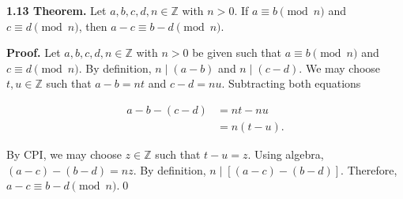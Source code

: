 \documentclass[12pt]{article}
\begin{document}
\noindent\textbf{1.13 Theorem.} Let $a,b,c,d,n\in\mathbb{Z}$ with $n>0$. If $a\equiv b\pmod{n}$ and $c\equiv d\pmod{n}$, then $a-c\equiv b-d\pmod{n}$.

\bigskip

\noindent\textbf{Proof.} Let $a,b,c,d,n\in\mathbb{Z}$ with $n>0$ be given such that $a\equiv b\pmod{n}$ and $c\equiv d\pmod{n}$. By definition, $n\mid(a-b)$ and $n\mid(c-d)$. We may choose $t,u \in \mathbb{Z}$ such that $a-b=nt$ and $c-d=nu$. Subtracting both equations

\begin{align*}
a-b - (c-d) &= nt - nu \\
&= n(t-u).
\end{align*}

\noindent By CPI, we may choose $z\in\mathbb{Z}$ such that $t-u=z$. Using algebra, $(a-c)-(b-d)=nz$. By definition, $n\mid[(a-c)-(b-d)]$. Therefore, $a-c\equiv b-d\pmod{n}$.\qed
\end{document}
